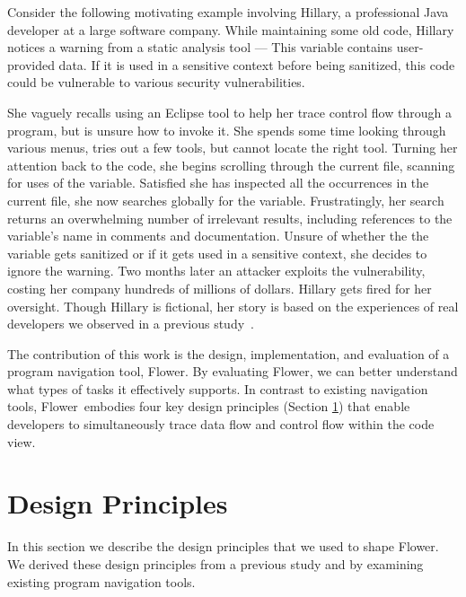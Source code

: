 \documentclass[conference]{IEEEtran}
\newcommand{\toolName}{Flower}
\begin{document}

Consider the following motivating example involving Hillary, a professional Java developer at a large software company.
While maintaining some old code, Hillary notices a warning from a static analysis tool --- This variable contains user-provided data. If it is used in a sensitive context before being sanitized, this code could be vulnerable to various security vulnerabilities.

She vaguely recalls using an Eclipse tool to help her trace control flow through a program, but is unsure how to invoke it.
She spends some time looking through various menus, tries out a few tools, but cannot locate the right tool.
Turning her attention back to the code, she begins scrolling through the current file, scanning for uses of the variable. 
Satisfied she has inspected all the occurrences in the current file, she now searches globally for the variable.
Frustratingly, her search returns an overwhelming number of irrelevant results, including references to the variable's name in comments and documentation.
Unsure of whether the the variable gets sanitized or if it gets used in a sensitive context, she decides to ignore the warning.
Two months later an attacker exploits the vulnerability, costing her company hundreds of millions of dollars. 
Hillary gets fired for her oversight. 
Though Hillary is fictional, her story is based on the experiences of real developers we observed in a previous study~\cite{Smith2015}.

The contribution of this work is the design, implementation, and evaluation of a program navigation tool, \toolName.
By evaluating \toolName, we can better understand what types of tasks it effectively supports. In contrast to existing navigation tools, \toolName~embodies four key design principles (Section \ref{DesignPrinciples}) that enable developers to simultaneously trace data flow and control flow within the code view. 


\section{Design Principles}
\label{DesignPrinciples}
In this section we describe the design principles that we used to shape \toolName. We derived these design principles from a previous study \cite{Smith2015} and by examining existing program navigation tools.
 
\end{document}
